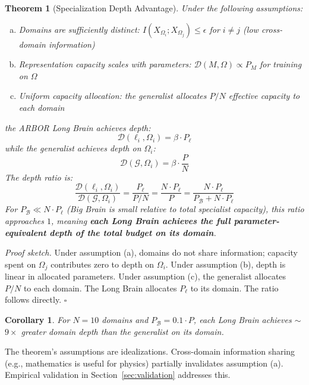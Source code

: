 \documentclass[12pt]{article}
\newtheorem{theorem}{Theorem}
\newtheorem{corollary}{Corollary}
\begin{document}
\begin{theorem}[Specialization Depth Advantage]
\label{thm:depth}
Under the following assumptions:
\begin{enumerate}[(a)]
    \item Domains are sufficiently distinct: $I(X_{\Omega_i}; X_{\Omega_j}) \leq \epsilon$ for $i \neq j$ (low cross-domain information)
    \item Representation capacity scales with parameters: $\mathcal{D}(M, \Omega) \propto P_M$ for training on $\Omega$
    \item Uniform capacity allocation: the generalist allocates $P/N$ effective capacity to each domain
\end{enumerate}
the ARBOR Long Brain achieves depth:
\begin{equation}
\mathcal{D}(\ell_i, \Omega_i) = \beta \cdot P_\ell
\end{equation}
while the generalist achieves depth on $\Omega_i$:
\begin{equation}
\mathcal{D}(\mathcal{G}, \Omega_i) = \beta \cdot \frac{P}{N}
\end{equation}
The depth ratio is:
\begin{equation}
\frac{\mathcal{D}(\ell_i, \Omega_i)}{\mathcal{D}(\mathcal{G}, \Omega_i)} = \frac{P_\ell}{P/N} = \frac{N \cdot P_\ell}{P} = \frac{N \cdot P_\ell}{P_\mathcal{B} + N \cdot P_\ell}
\end{equation}
For $P_\mathcal{B} \ll N \cdot P_\ell$ (Big Brain is small relative to total specialist capacity), this ratio approaches $1$, meaning \textbf{each Long Brain achieves the full parameter-equivalent depth of the total budget on its domain}.
\end{theorem}

\textit{Proof sketch.} Under assumption (a), domains do not share information; capacity spent on $\Omega_j$ contributes zero to depth on $\Omega_i$. Under assumption (b), depth is linear in allocated parameters. Under assumption (c), the generalist allocates $P/N$ to each domain. The Long Brain allocates $P_\ell$ to its domain. The ratio follows directly. $\square$

\begin{corollary}
For $N = 10$ domains and $P_\mathcal{B} = 0.1 \cdot P$, each Long Brain achieves $\sim$$9\times$ greater domain depth than the generalist on its domain.
\end{corollary}

The theorem's assumptions are idealizations. Cross-domain information sharing (e.g., mathematics is useful for physics) partially invalidates assumption (a). Empirical validation in Section~\ref{sec:validation} addresses this.
\end{document}

